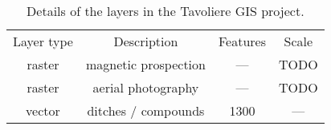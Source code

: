 \begin{table}
    \centering
    \begin{tabular}{cccc}
        \toprule
        Layer type & Description          & Features & Scale \\
        \otoprule
        raster     & magnetic prospection & ---      & TODO  \\
        raster     & aerial photography   & ---      & TODO  \\
        vector     & ditches / compounds  & 1300   & ---   \\
        \bottomrule
    \end{tabular}
    \caption[List of layers in Tavoliere neolithic GIS project]{Details of the layers in the Tavoliere GIS project.
    \label{tab:layers}
    }
\end{table}
